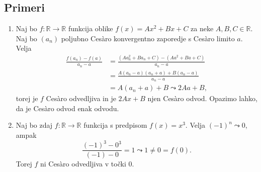 \documentclass[a4paper,12pt]{article}
\theoremstyle{definition}
\theoremstyle{plain}
\begin{document}
\subsection*{Primeri}
\begin{enumerate}
    \item Naj bo $f: \mathbb{R} \rightarrow \mathbb{R}$ funkcija oblike $f(x) = Ax^2 + Bx + C$ za neke $A, B, C \in \mathbb{R}$. Naj bo $(a_n)$ poljubno Ces\`{a}ro konvergentno zaporedje s Ces\`{a}ro limito $a$. Velja 
    \begin{align*}
        \frac{f(a_n)-f(a)}{a_n-a} &= \frac{(Aa_n^2 + Ba_n + C)-(Aa^2 + Ba + C)}{a_n-a}\\
        &= \frac{A(a_n-a)(a_n+a) + B(a_n-a)}{a_n-a}\\
        &= A(a_n+a) + B \leadsto 2Aa + B,
    \end{align*}
    torej je $f$ Ces\`{a}ro odvedljiva in je $2Ax + B$ njen Ces\`{a}ro odvod. Opazimo lahko, da je Ces\`{a}ro odvod enak odvodu.
    \item Naj bo zdaj $f: \mathbb{R} \rightarrow \mathbb{R}$ funkcija s predpisom $f(x) = x^3$. Velja $(-1)^n \leadsto 0$, ampak $$\frac{(-1)^3-0^3}{(-1)-0} = 1 \leadsto 1 \neq 0 = f(0).$$ Torej $f$ ni Ces\`{a}ro odvedljiva v točki 0.
\end{enumerate}
\end{document}
